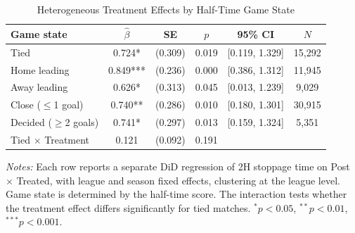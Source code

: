 \begin{table}[htbp]
\centering
\caption{Heterogeneous Treatment Effects by Half-Time Game State}
\label{tab:het_game_state}
\begin{threeparttable}
\begin{tabular}{lccccc}
\toprule
Game state & $\hat{\beta}$ & SE & $p$ & 95\% CI & $N$ \\
\midrule
  Tied & 0.724* & (0.309) & 0.019 & [0.119, 1.329] & 15,292 \\
  Home leading & 0.849*** & (0.236) & 0.000 & [0.386, 1.312] & 11,945 \\
  Away leading & 0.626* & (0.313) & 0.045 & [0.013, 1.239] & 9,029 \\
  Close ($\leq$1 goal) & 0.740** & (0.286) & 0.010 & [0.180, 1.301] & 30,915 \\
  Decided ($\geq$2 goals) & 0.741* & (0.297) & 0.013 & [0.159, 1.324] & 5,351 \\
\midrule
  Tied $\times$ Treatment & 0.121 & (0.092) & 0.191 & & \\
\bottomrule
\end{tabular}
\begin{tablenotes}[flushleft]\footnotesize
\item \textit{Notes:} Each row reports a separate DiD regression of 2H stoppage time on Post $\times$ Treated, with league and season fixed effects, clustering at the league level. Game state is determined by the half-time score. The interaction tests whether the treatment effect differs significantly for tied matches. $^{*}p<0.05$, $^{**}p<0.01$, $^{***}p<0.001$.
\end{tablenotes}
\end{threeparttable}
\end{table}
